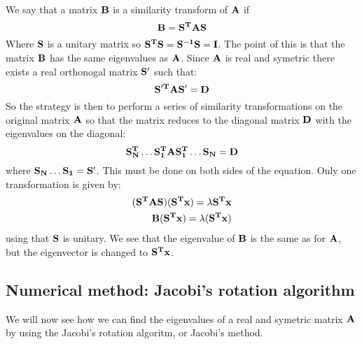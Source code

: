 \documentclass[11pt,a4wide]{article}
\begin{document}
We say that a matrix $\bf B$ is a similarity transform of $\bf A$ if 
\[
\bf B = \bf {S^T AS}
\]
Where $\bf S$ is a unitary matrix so $\bf{S^TS} = \bf{S^{-1}S} = \bf I$. The point of this is that the matrix $\bf B$ has the same eigenvalues as $\bf A$. Since $\bf A$ is real and symetric there exists a real orthonogal matrix $\bf S'$ such that: %
\[
\bf {S'^T AS'} = \bf D
\]
So the strategy is then to perform a series of similarity transformations on the original matrix $\bf A$ so that the matrix reduces to the diagonal matrix $\bf D$ with the eigenvalues on the diagonal:
\[
\bf{S_N^T\dots S_1^TAS_1^T\dots S_N} = \bf D
\]
where $\bf{S_N\dots S_1} = \bf S'$. This must be done on both sides of the equation. Only one transformation is given by:
\begin{align*}
(\bf{S^TAS})(\bf{S^Tx}) = \lambda \bf{S^Tx} \\
\bf{B(S^Tx)} = \lambda\bf{(S^Tx)}
\end{align*}
using that $\bf S$ is unitary. We see that the eigenvalue of $\bf B$ is the same as for $\bf A$, but the eigenvector is changed to $\bf{S^Tx}$.

\subsection{Numerical method: Jacobi's rotation algorithm}
We will now see how we can find the eigenvalues of a real and symetric matrix $\bf A$ by using the Jacobi's rotation algoritm, or Jacobi's method.
\end{document}

